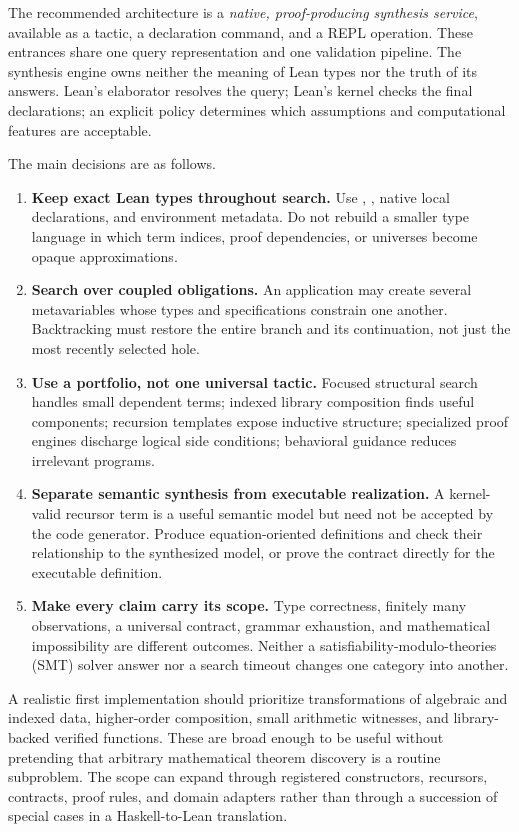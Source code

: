 \documentclass[11pt,a4paper]{article}
\newcommand{\code}[1]{\texttt{\detokenize{#1}}}
\theoremstyle{remark}
\begin{document}
The recommended architecture is a \emph{native, proof-producing synthesis service}, available as a tactic, a declaration command, and a REPL operation. These entrances share one query representation and one validation pipeline. The synthesis engine owns neither the meaning of Lean types nor the truth of its answers. Lean's elaborator resolves the query; Lean's kernel checks the final declarations; an explicit policy determines which assumptions and computational features are acceptable.

The main decisions are as follows.
\begin{enumerate}
\item \textbf{Keep exact Lean types throughout search.} Use \code{Expr}, \code{Level}, native local declarations, and environment metadata. Do not rebuild a smaller type language in which term indices, proof dependencies, or universes become opaque approximations.
\item \textbf{Search over coupled obligations.} An application may create several metavariables whose types and specifications constrain one another. Backtracking must restore the entire branch and its continuation, not just the most recently selected hole.
\item \textbf{Use a portfolio, not one universal tactic.} Focused structural search handles small dependent terms; indexed library composition finds useful components; recursion templates expose inductive structure; specialized proof engines discharge logical side conditions; behavioral guidance reduces irrelevant programs.
\item \textbf{Separate semantic synthesis from executable realization.} A kernel-valid recursor term is a useful semantic model but need not be accepted by the code generator. Produce equation-oriented definitions and check their relationship to the synthesized model, or prove the contract directly for the executable definition.
\item \textbf{Make every claim carry its scope.} Type correctness, finitely many observations, a universal contract, grammar exhaustion, and mathematical impossibility are different outcomes. Neither a satisfiability-modulo-theories (SMT) solver answer nor a search timeout changes one category into another.
\end{enumerate}

A realistic first implementation should prioritize transformations of algebraic and indexed data, higher-order composition, small arithmetic witnesses, and library-backed verified functions. These are broad enough to be useful without pretending that arbitrary mathematical theorem discovery is a routine subproblem. The scope can expand through registered constructors, recursors, contracts, proof rules, and domain adapters rather than through a succession of special cases in a Haskell-to-Lean translation.
\end{document}
